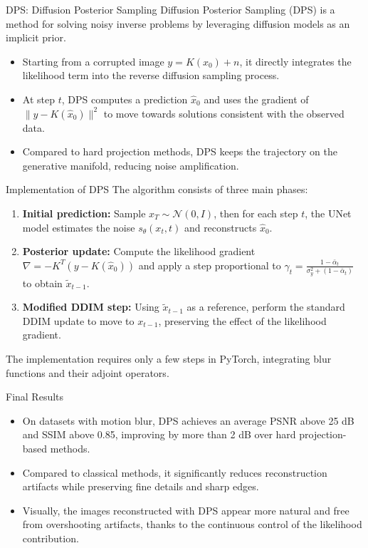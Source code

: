 \begin{frame}{DPS: Diffusion Posterior Sampling}
  Diffusion Posterior Sampling (DPS) is a method for solving noisy inverse problems by leveraging diffusion models as an implicit prior.
  \begin{itemize}
    \item Starting from a corrupted image $y = K(x_0) + n$, it directly integrates the likelihood term into the reverse diffusion sampling process.
    \item At step $t$, DPS computes a prediction $\hat x_0$ and uses the gradient of $\|y - K(\hat x_0)\|^2$ to move towards solutions consistent with the observed data.
    \item Compared to hard projection methods, DPS keeps the trajectory on the generative manifold, reducing noise amplification.
  \end{itemize}
\end{frame}

\begin{frame}[fragile]{Implementation of DPS}
  The algorithm consists of three main phases:
  \begin{enumerate}
    \item \textbf{Initial prediction:} Sample $x_T \sim \mathcal{N}(0, I)$, then for each step $t$, the UNet model estimates the noise $s_\theta(x_t, t)$ and reconstructs $\hat x_0$.
    \item \textbf{Posterior update:} Compute the likelihood gradient $\nabla = -K^T(y - K(\hat x_0))$ and apply a step proportional to $\gamma_t = \frac{1 - \bar\alpha_t}{\sigma_y^2 + (1 - \bar\alpha_t)}$ to obtain $\tilde x_{t-1}$.
    \item \textbf{Modified DDIM step:} Using $\tilde x_{t-1}$ as a reference, perform the standard DDIM update to move to $x_{t-1}$, preserving the effect of the likelihood gradient.
  \end{enumerate}
  \vspace{0.5em}
  The implementation requires only a few steps in PyTorch, integrating blur functions and their adjoint operators.
\end{frame}

\begin{frame}{Final Results}
  \begin{itemize}
    \item On datasets with motion blur, DPS achieves an average PSNR above 25 dB and SSIM above 0.85, improving by more than 2 dB over hard projection-based methods.
    \item Compared to classical methods, it significantly reduces reconstruction artifacts while preserving fine details and sharp edges.
    \item Visually, the images reconstructed with DPS appear more natural and free from overshooting artifacts, thanks to the continuous control of the likelihood contribution.
  \end{itemize}
\end{frame}